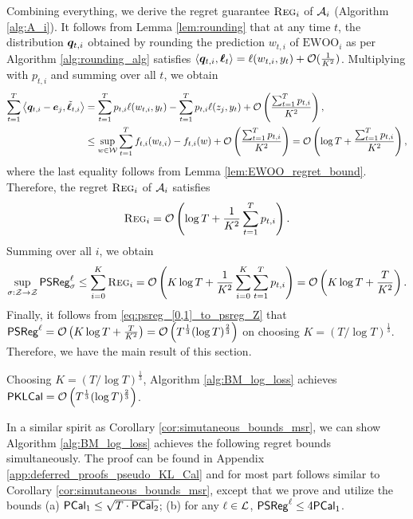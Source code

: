 Combining everything, we derive the regret guarantee $\textsc{Reg}_{i}$ of $\mathcal{A}_{i}$ (Algorithm \ref{alg:A_i}). It follows from Lemma \ref{lem:rounding} that at any time $t$, the distribution ${\bm{q}}_{t, i}$ obtained by rounding the prediction $w_{t, i}$ of $\text{EWOO}_{i}$ as per Algorithm \ref{alg:rounding_alg} satisfies $\left\langle {\ensuremath{\bm{q}}}_{t, i}, \bm{\ell}_{t} \right\rangle =  \ell(w_{t, i}, y_{t}) + \mathcal{O}(\frac{1}{K ^ {2}})$. Multiplying with $p_{t, i}$ and summing over all $t$, we obtain \begin{align}
    \sum_{t = 1} ^ {T} \left\langle {\ensuremath{\bm{q}}}_{t, i} - {\bm{e}}_{j}, \tilde{\bm{\ell}}_{t, i} \right\rangle &= \sum_{t = 1} ^ {T} p_{t, i} \ell(w_{t, i}, y_{t}) - \sum_{t = 1} ^ {T} p_{t, i} \ell(z_{j}, y_t) + \mathcal{O}\left( \frac{\sum_{t = 1} ^ {T} p_{t, i}}{K ^ {2}} \right), \nonumber \\
    &\le \sup_{w \in \mathcal{W}} {\sum_{t = 1} ^ {T} f_{t, i}(w_{t, i}) - f_{t, i}(w)} + \mathcal{O}\left( \frac{ \sum_{t = 1} ^ {T} p_{t, i}}{K ^ {2}} \right) = \mathcal{O}\left( \log T + {\frac{\sum_{t = 1} ^ {T} p_{t, i}}{K ^ {2}}} \right) \nonumber,
\end{align}
where the last equality follows from Lemma \ref{lem:EWOO_regret_bound}. Therefore, the regret $\textsc{Reg}_{i}$ of $\mathcal{A}_{i}$ satisfies $$\textsc{Reg}_{i} = \mathcal{O}\left( \log T + \frac{1}{K ^ {2}} \sum_{t = 1} ^ {T} p_{t, i} \right).$$ Summing over all $i$, we obtain \begin{align*}
    \sup_{{\sigma: \mathcal{Z} \to \mathcal{Z}}} \mathsf{PSReg}_{\sigma} ^ {\ell} \le \sum_{i = 0} ^ {K} \textsc{Reg}_{i} = \mathcal{O} \left( K \log T + \frac{1}{K ^ {2}} \sum_{i = 0} ^ {K} \sum_{t = 1} ^ {T} p_{t, i} \right) = \mathcal{O}\left( K \log T + \frac{T}{K ^ {2}} \right).
\end{align*}
Finally, it follows from \eqref{eq:psreg_[0,1]_to_psreg_Z} that $\mathsf{PSReg} ^ {\ell} = \mathcal{O}\left( K \log T + \frac{T}{K ^ {2}} \right) = \mathcal{O}\left( T^{\frac{1}{3}} (\log T) ^ {\frac{2}{3}} \right)$
on choosing $K = (T/\log T)^{\frac{1}{3}}$. Therefore, we have the main result of this section.
\begin{theorem}\label{thm:bound_pkcal}
     Choosing $K = (T/\log T)^{\frac{1}{3}}$, Algorithm \ref{alg:BM_log_loss} achieves $\mathsf{PKLCal} = \mathcal{O}\left( T^{\frac{1}{3}} (\log T) ^ {\frac{2}{3}} \right)$.
\end{theorem}
In a similar spirit as Corollary \ref{cor:simutaneous_bounds_msr}, we can show Algorithm \ref{alg:BM_log_loss} achieves the following regret bounds simultaneously. The proof can be found in Appendix \ref{app:deferred_proofs_pseudo_KL_Cal} and for most part follows similar to Corollary \ref{cor:simutaneous_bounds_msr}, except that we prove and utilize the bounds (a) $\mathsf{PCal}_{1} \le \sqrt{T \cdot \mathsf{PCal}_{2}}$; (b) for any $\ell \in \mathcal{L}$, $\mathsf{PSReg}^{\ell} \le 4\mathsf{PCal}_{1}$. 


